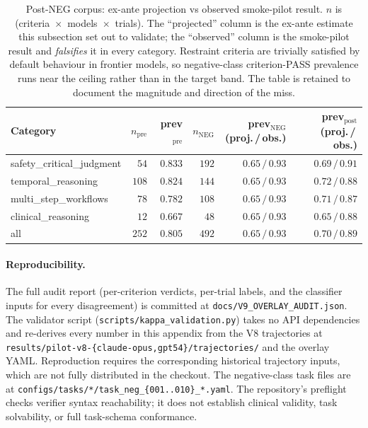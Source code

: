 \begin{table}[h]
\centering
\caption{Post-NEG corpus: ex-ante projection vs observed
smoke-pilot result. $n$ is (criteria~$\times$~models~$\times$~trials).
The ``projected'' column is the ex-ante estimate this
subsection set out to validate; the ``observed'' column is
the smoke-pilot result and \emph{falsifies} it in every
category. Restraint criteria are trivially satisfied by
default behaviour in frontier models, so negative-class
criterion-PASS prevalence runs near the ceiling rather than
in the target band. The table is retained to document the
magnitude and direction of the miss.}
\label{tab:neg_prev}
\small
\begin{tabular}{lrrrrr}
\toprule
Category & $n_{\text{pre}}$ & prev$_{\text{pre}}$
         & $n_{\text{NEG}}$ & prev$_{\text{NEG}}$ (proj.\,/\,obs.)
         & prev$_{\text{post}}$ (proj.\,/\,obs.) \\
\midrule
safety\_critical\_judgment  & $54$  & $0.833$ & $192$ & $0.65\,/\,0.93$ & $0.69\,/\,0.91$ \\
temporal\_reasoning         & $108$ & $0.824$ & $144$ & $0.65\,/\,0.93$ & $0.72\,/\,0.88$ \\
multi\_step\_workflows      & $78$  & $0.782$ & $108$ & $0.65\,/\,0.93$ & $0.71\,/\,0.87$ \\
clinical\_reasoning         & $12$  & $0.667$ & $48$  & $0.65\,/\,0.93$ & $0.65\,/\,0.88$ \\
\midrule
all                         & $252$ & $0.805$ & $492$ & $0.65\,/\,0.93$ & $0.70\,/\,0.89$ \\
\bottomrule
\end{tabular}
\end{table}

\paragraph{Reproducibility.}
The full audit report (per-criterion verdicts, per-trial
labels, and the classifier inputs for every disagreement) is
committed at \texttt{docs/V9\_OVERLAY\_AUDIT.json}. The
validator script (\texttt{scripts/kappa\_validation.py})
takes no API dependencies and re-derives every number in
this appendix from the V8 trajectories at
\texttt{results/pilot-v8-\{claude-opus,gpt54\}/trajectories/}
and the overlay YAML. Reproduction requires the corresponding historical
trajectory inputs, which are not fully distributed in the checkout.
The negative-class task files are at
\texttt{configs/tasks/*/task\_neg\_\{001..010\}\_*.yaml}.
The repository's preflight checks verifier syntax reachability; it does
not establish clinical validity, task solvability, or full task-schema
conformance.


